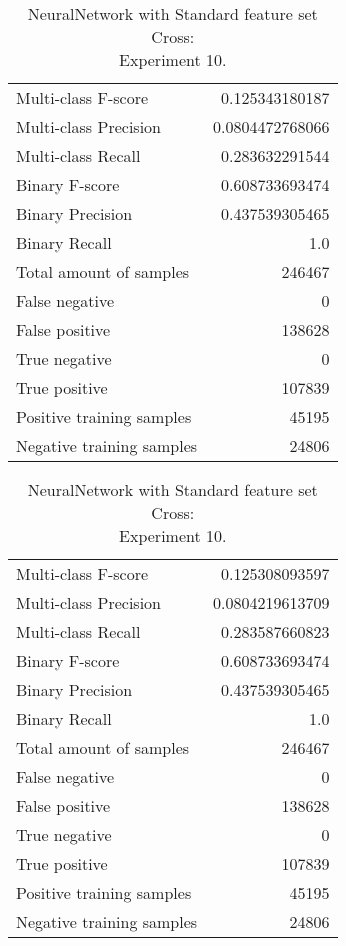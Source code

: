 \begin{table}[H]
\begin{minipage}{0.5\textwidth}
\caption{NeuralNetwork with Standard feature set Cross: \\Experiment 9.}
\centering
\begin{tabular}{l r}
\toprule
Multi-class F-score & 0.125343180187 \\
Multi-class Precision & 0.0804472768066 \\
Multi-class Recall & 0.283632291544 \\
\midrule
Binary F-score & 0.608733693474 \\
Binary Precision & 0.437539305465 \\
Binary Recall & 1.0 \\
\midrule
Total amount of samples & 246467 \\
False negative & 0 \\
False positive & 138628 \\
True negative & 0 \\
True positive & 107839 \\
\midrule
Positive training samples & 45195 \\
Negative training samples & 24806 \\
\bottomrule
\end{tabular}
\end{minipage}
\hfillx
\begin{minipage}{0.5\textwidth}
\caption{NeuralNetwork with Standard feature set Cross: \\Experiment 10.}
\centering
\begin{tabular}{l r}
\toprule
Multi-class F-score & 0.125308093597 \\
Multi-class Precision & 0.0804219613709 \\
Multi-class Recall & 0.283587660823 \\
\midrule
Binary F-score & 0.608733693474 \\
Binary Precision & 0.437539305465 \\
Binary Recall & 1.0 \\
\midrule
Total amount of samples & 246467 \\
False negative & 0 \\
False positive & 138628 \\
True negative & 0 \\
True positive & 107839 \\
\midrule
Positive training samples & 45195 \\
Negative training samples & 24806 \\
\bottomrule
\end{tabular}
\end{minipage}
\end{table}
